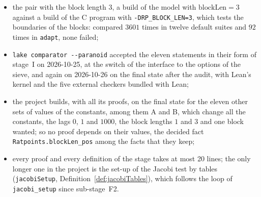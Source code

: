 \begin{itemize}
    \verb|test4high| and $92$ in \verb|adapt|, $69$ of them where the C program may correct its
    moduli, none failed, both programs on one machine;
  \item the pair with the block length $3$, a build of the model with $\mathrm{blockLen} = 3$
    against a build of the C program with \verb|-DRP_BLOCK_LEN=3|, which tests the boundaries of the
    blocks: compared $3601$ times in twelve default suites and $92$ times in \verb|adapt|, none
    failed;
  \item \verb|lake comparator --paranoid| accepted the eleven statements in their form of stage~I on
    2026-10-25, at the switch of the interface to the options of the sieve, and again on 2026-10-26
    on the final state after the audit, with Lean's kernel and the five external checkers bundled
    with Lean;
  \item the project builds, with all its proofs, on the final state for the eleven other sets of
    values of the constants, among them A and B, which change all the constants, the lags $0$, $1$
    and $1000$, the block lengths $1$ and $3$ and one block wanted; so no proof depends on their
    values, the decided fact \verb|Ratpoints.blockLen_pos| among the facts that they keep;
  \item every proof and every definition of the stage takes at most 20 lines; the only longer one in
    the project is the set-up of the Jacobi test by tables (\verb|jacobiSetup|,
    Definition~\ref{def:jacobiTables}), which follows the loop of \verb|jacobi_setup| since
    sub-stage~F2.
\end{itemize}
